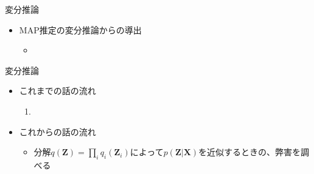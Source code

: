 \documentclass[dvipdfmx,notheorems,t]{beamer}
\begin{document}
\begin{frame}{変分推論}

\begin{itemize}
	\item MAP推定の変分推論からの導出
	\begin{itemize}
		\item %
	\end{itemize}
\end{itemize}

\end{frame}

\begin{frame}{変分推論}

\begin{itemize}
	\item これまでの話の流れ
	\begin{enumerate}
		\item %
	\end{enumerate}
	
	\item これからの話の流れ
	\begin{itemize}
		\item 分解$q(\bm{Z}) = \prod_i q_i(\bm{Z}_i)$によって$p(\bm{Z} | \bm{X})$を近似するときの、弊害を調べる
	\end{itemize}
\end{itemize}

\end{frame}
\end{document}
